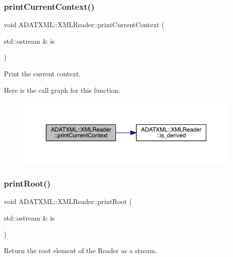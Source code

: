 \subsubsection{\texorpdfstring{printCurrentContext()}{printCurrentContext()}\hspace{0.1cm}{\footnotesize\ttfamily [3/3]}}
{\footnotesize\ttfamily void A\+D\+A\+T\+X\+M\+L\+::\+X\+M\+L\+Reader\+::print\+Current\+Context (\begin{DoxyParamCaption}\item[{std\+::ostream \&}]{is }\end{DoxyParamCaption})}



Print the current context. 

Here is the call graph for this function\+:
\nopagebreak
\begin{figure}[H]
\begin{center}
\leavevmode
\includegraphics[width=350pt]{db/d3f/classADATXML_1_1XMLReader_a424f9e30746b4fdc106b57b5ce95f7ec_cgraph}
\end{center}
\end{figure}
\mbox{\label{classADATXML_1_1XMLReader_a732a08c1605f8c01663105bb3586b575}} 
\subsubsection{\texorpdfstring{printRoot()}{printRoot()}\hspace{0.1cm}{\footnotesize\ttfamily [1/3]}}
{\footnotesize\ttfamily void A\+D\+A\+T\+X\+M\+L\+::\+X\+M\+L\+Reader\+::print\+Root (\begin{DoxyParamCaption}\item[{std\+::ostream \&}]{is }\end{DoxyParamCaption})}



Return the root element of the Reader as a stream. 

